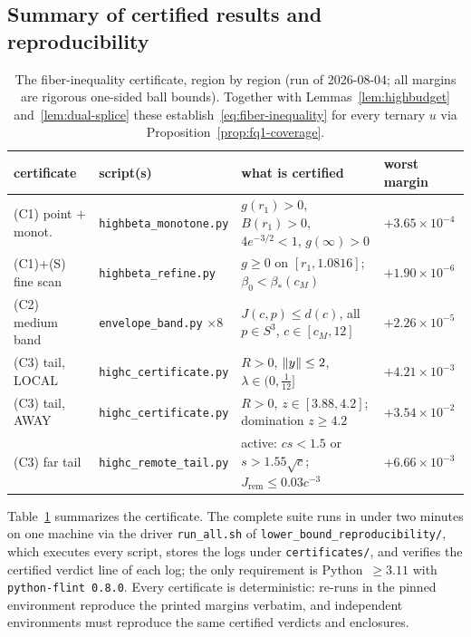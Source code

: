 \subsection{Summary of certified results and reproducibility}
\label{app:cert-summary}

\begin{table}[h]\centering
\footnotesize
\setlength{\tabcolsep}{4pt}
\begin{tabular}{llll}
\hline
certificate & script(s) & what is certified & worst margin \\
\hline
(C1) point $+$ monot. & \texttt{highbeta\_monotone.py} & $g(r_1)>0$, $B(r_1)>0$, $4e^{-3/2}<1$, $g(\infty)>0$ & $+3.65\times10^{-4}$ \\
(C1)$+$(S) fine scan & \texttt{highbeta\_refine.py} & $g\ge0$ on $[r_1,1.0816]$; $\beta_0<\beta_*(c_M)$ & $+1.90\times10^{-6}$ \\
(C2) medium band & \texttt{envelope\_band.py} $\times8$ & $J(c,p)\le d(c)$, all $p\in S^3$, $c\in[c_M,12]$ & $+2.26\times10^{-5}$ \\
(C3) tail, LOCAL & \texttt{highc\_certificate.py} & $R>0$, $\lVert y\rVert\le2$, $\lambda\in(0,\tfrac1{12}]$ & $+4.21\times10^{-3}$ \\
(C3) tail, AWAY & \texttt{highc\_certificate.py} & $R>0$, $z\in[3.88,4.2]$; domination $z\ge4.2$ & $+3.54\times10^{-2}$ \\
(C3) far tail & \texttt{highc\_remote\_tail.py} & active: $cs<1.5$ or $s>1.55\sqrt c$; $J_{\mathrm{rem}}\le0.03c^{-3}$ & $+6.66\times10^{-3}$ \\
\hline
\end{tabular}
\caption{The fiber-inequality certificate, region by region (run of 2026-08-04; all margins are rigorous one-sided ball bounds). Together with Lemmas~\ref{lem:highbudget} and~\ref{lem:dual-splice} these establish~\eqref{eq:fiber-inequality} for every ternary $u$ via Proposition~\ref{prop:fq1-coverage}.}
\label{tab:fq1-results}
\end{table}

Table~\ref{tab:fq1-results} summarizes the certificate. The complete suite runs in under two minutes on one machine via the driver \texttt{run\_all.sh} of \texttt{lower\_bound\_reproducibility/}, which executes every script, stores the logs under \texttt{certificates/}, and verifies the certified verdict line of each log; the only requirement is Python~$\ge3.11$ with \texttt{python-flint~0.8.0}. Every certificate is deterministic: re-runs in the pinned environment reproduce the printed margins verbatim, and independent environments must reproduce the same certified verdicts and enclosures.

